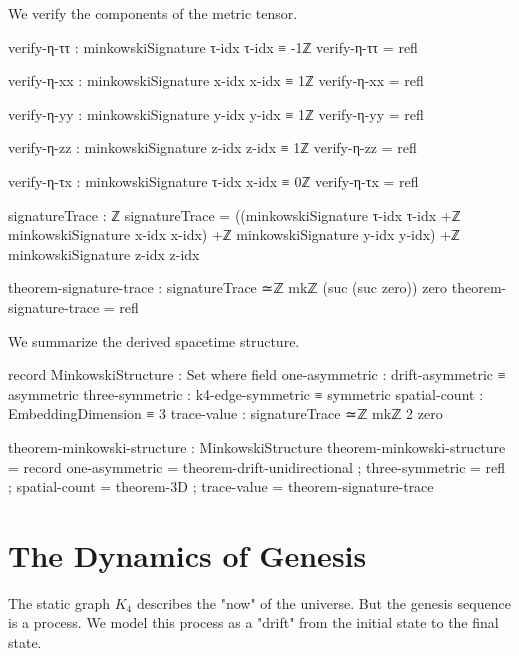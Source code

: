 \documentclass[11pt,a4paper]{book}
\begin{document}
We verify the components of the metric tensor.

\begin{code}
verify-η-ττ : minkowskiSignature τ-idx τ-idx ≡ -1ℤ
verify-η-ττ = refl

verify-η-xx : minkowskiSignature x-idx x-idx ≡ 1ℤ
verify-η-xx = refl

verify-η-yy : minkowskiSignature y-idx y-idx ≡ 1ℤ
verify-η-yy = refl

verify-η-zz : minkowskiSignature z-idx z-idx ≡ 1ℤ
verify-η-zz = refl

verify-η-τx : minkowskiSignature τ-idx x-idx ≡ 0ℤ
verify-η-τx = refl

signatureTrace : ℤ
signatureTrace = ((minkowskiSignature τ-idx τ-idx +ℤ 
                   minkowskiSignature x-idx x-idx) +ℤ
                   minkowskiSignature y-idx y-idx) +ℤ
                   minkowskiSignature z-idx z-idx

theorem-signature-trace : signatureTrace ≃ℤ mkℤ (suc (suc zero)) zero
theorem-signature-trace = refl
\end{code}

We summarize the derived spacetime structure.

\begin{code}
record MinkowskiStructure : Set where
  field
    one-asymmetric   : drift-asymmetric ≡ asymmetric
    three-symmetric  : k4-edge-symmetric ≡ symmetric
    spatial-count    : EmbeddingDimension ≡ 3
    trace-value      : signatureTrace ≃ℤ mkℤ 2 zero

theorem-minkowski-structure : MinkowskiStructure
theorem-minkowski-structure = record
  { one-asymmetric = theorem-drift-unidirectional
  ; three-symmetric = refl
  ; spatial-count = theorem-3D
  ; trace-value = theorem-signature-trace
  }
\end{code}

\section{The Dynamics of Genesis}

The static graph $K_4$ describes the "now" of the universe. But the genesis sequence is a process. We model this process as a "drift" from the initial state to the final state.
\end{document}
